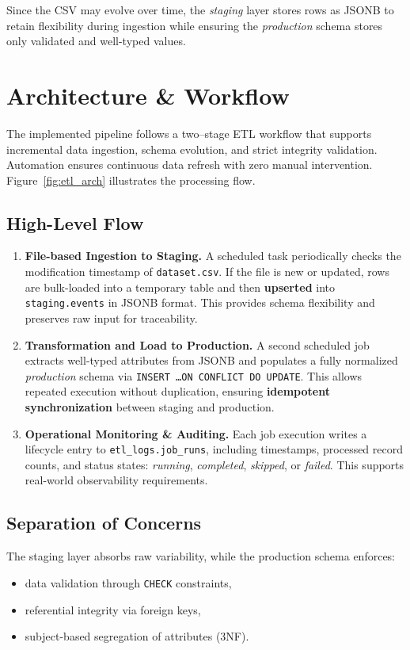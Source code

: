 \documentclass[11pt]{article}
\begin{document}
Since the CSV may evolve over time, the \textit{staging} layer stores rows as JSONB to retain flexibility during ingestion while ensuring the \textit{production} schema stores only validated and well-typed values.


\section{Architecture \& Workflow}

The implemented pipeline follows a two–stage ETL workflow that supports incremental data ingestion, schema evolution, and strict integrity validation. Automation ensures continuous data refresh with zero manual intervention. Figure~\ref{fig:etl_arch} illustrates the processing flow.

\subsection*{High-Level Flow}
\begin{enumerate}[leftmargin=1.8em]
  \item \textbf{File-based Ingestion to Staging.} A scheduled task periodically checks the modification timestamp of \texttt{dataset.csv}. If the file is new or updated, rows are bulk-loaded into a temporary table and then \textbf{upserted} into \texttt{staging.events} in JSONB format. This provides schema flexibility and preserves raw input for traceability.
  
  \item \textbf{Transformation and Load to Production.} A second scheduled job extracts well-typed attributes from JSONB and populates a fully normalized \textit{production} schema via \texttt{INSERT \ldots ON CONFLICT DO UPDATE}. This allows repeated execution without duplication, ensuring \textbf{idempotent synchronization} between staging and production.

  \item \textbf{Operational Monitoring \& Auditing.} Each job execution writes a lifecycle entry to \texttt{etl\_logs.job\_runs}, including timestamps, processed record counts, and status states: \emph{running}, \emph{completed}, \emph{skipped}, or \emph{failed}. This supports real-world observability requirements.
\end{enumerate}

\subsection*{Separation of Concerns}
The staging layer absorbs raw variability, while the production schema enforces:
\begin{itemize}
\item data validation through \texttt{CHECK} constraints,
\item referential integrity via foreign keys,
\item subject-based segregation of attributes (3NF).
\end{itemize}
\end{document}
